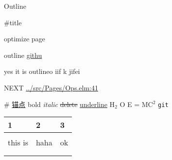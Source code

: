 \documentclass[presentation]{beamer}
\author{边城道馆}
\date{\today}
\title{}
\begin{document}
\begin{frame}{Outline}
\tableofcontents
\end{frame}

\begin{frame}[fragile,label={sec:org9f7e2ac}]{\#title}
 \begin{block}{optimize page}
\end{block}

\begin{block}{}
\end{block}
\begin{block}{outline}
\href{https://github.com/Numberartificial/cibops}{githu}
\begin{block}{yes it is outlineo}
iif k
jifei
\end{block}
\end{block}
\begin{block}{NEXT}
\url{../src/Pages/Ops.elm:41}
\end{block}
\begin{block}{}
\#\label{org6d04c6a}
\hyperlink{org6d04c6a}{锚点}
\alert{bold}
\emph{italic}
\sout{delete}
\uline{underline}
H\(_{\text{2}}\) O
E = MC\(^{\text{2}}\)
\texttt{git}
\end{block}
\begin{block}{}
\begin{center}
\begin{tabular}{lll}
1 & 2 & 3\\
\hline
 &  & \\
this is & haha & ok\\
 &  & \\
\hline
 &  & \\
\end{tabular}
\end{center}
\end{block}
\end{frame}
\end{document}
